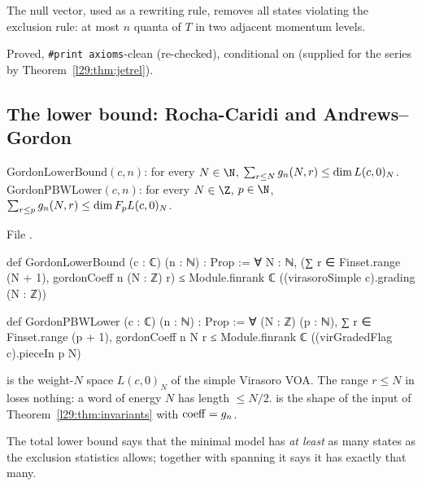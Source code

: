 \begin{physics}
The null vector, used as a rewriting rule, removes all states violating the exclusion rule: at most $n$ quanta of
$T$ in two adjacent momentum levels.
\end{physics}

\begin{status}
Proved, \texttt{\#print axioms}-clean (re-checked), conditional on  (supplied for the series by
Theorem~\ref{l29:thm:jetrel}).
\end{status}

\subsection{The lower bound: Rocha-Caridi and Andrews--Gordon}

\begin{definition}\label{l29:def:gordonlower}
$\mathrm{GordonLowerBound}(c,n)$: for every $N\in\N$, $\sum_{r\le N}g_n(N,r)\le\dim L(c,0)_N$.
$\mathrm{GordonPBWLower}(c,n)$: for every $N\in\Z$, $p\in\N$, $\sum_{r\le p}g_n(N,r)\le\dim F_pL(c,0)_N$.
\end{definition}

\noindent File .
\begin{leancode}
def GordonLowerBound (c : ℂ) (n : ℕ) : Prop :=
  ∀ N : ℕ, (∑ r ∈ Finset.range (N + 1), gordonCoeff n (N : ℤ) r) ≤
    Module.finrank ℂ ((virasoroSimple c).grading (N : ℤ))

def GordonPBWLower (c : ℂ) (n : ℕ) : Prop :=
  ∀ (N : ℤ) (p : ℕ), ∑ r ∈ Finset.range (p + 1), gordonCoeff n N r ≤
    Module.finrank ℂ ((virGradedFlag c).pieceIn p N)
\end{leancode}

\begin{dictionary}
 is the weight-$N$ space $L(c,0)_N$ of the simple Virasoro VOA. The range
$r\le N$ in  loses nothing: a word of energy $N$ has length $\le N/2$.  is
the shape of the input  of Theorem~\ref{l29:thm:invariants} with $\mathrm{coeff}=g_n$.
\end{dictionary}

\begin{physics}
The total lower bound says that the minimal model has \emph{at least} as many states as the exclusion statistics
allows; together with spanning it says it has exactly that many.
\end{physics}

